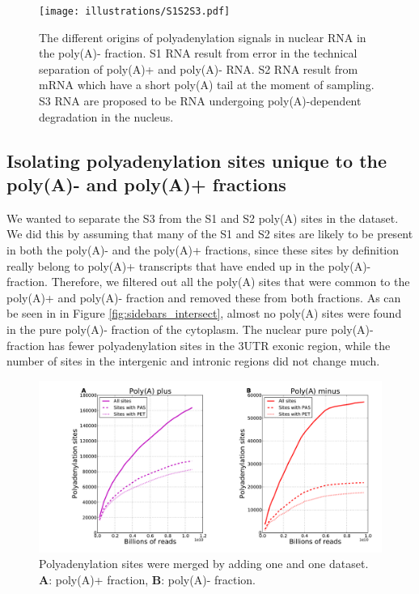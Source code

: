 \begin{figure}[hb]
	\begin{center}
		\texttt{[image: illustrations/S1S2S3.pdf]}
	\end{center}
	\caption{The different origins of polyadenylation signals in nuclear RNA
	in the poly(A)- fraction. S1 RNA result from error in the technical
	separation of poly(A)+ and poly(A)- RNA. S2 RNA result from mRNA which have
	a short poly(A) tail at the moment of sampling. S3 RNA are proposed to be
	RNA undergoing poly(A)-dependent degradation in the nucleus.}
	\label{fig:S123}
\end{figure}

\subsection{Isolating polyadenylation sites unique to the poly(A)- and poly(A)+
fractions}
We wanted to separate the S3 from the S1 and S2 poly(A) sites in the dataset.
We did this by assuming that many of the S1 and S2 sites are likely to be
present in both the poly(A)- and the poly(A)+ fractions, since these sites by
definition really belong to poly(A)+ transcripts that have ended up in the
poly(A)- fraction. Therefore, we filtered out all the poly(A) sites that were
common to the poly(A)+ and poly(A)- fraction and removed these from both
fractions. As can be seen in in Figure \ref{fig:sidebars_intersect}, almost no
poly(A) sites were found in the pure poly(A)- fraction of the cytoplasm. The
nuclear pure poly(A)- fraction has fewer polyadenylation sites in the 3\p UTR
exonic region, while the number of sites in the intergenic and intronic regions
did not change much.

\begin{figure}[hb]
	\begin{center}
		\includegraphics[scale=0.3]{figures/polyadenylation/Saturation_plot_2+.pdf}
	\end{center}
	\caption{Polyadenylation sites were merged by adding one and one dataset.
	\textbf{A}: poly(A)+ fraction, \textbf{B}: poly(A)- fraction.}
	\label{fig:saturation}
\end{figure}

